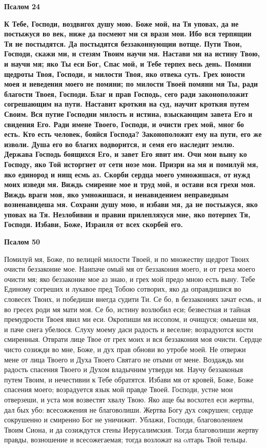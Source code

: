 \medskip
\bfseries Псалом 24\normalfont{}\nopagebreak

\bfseries \normalfont{}К Тебе, Господи, воздвигох душу мою. Боже мой, на Тя уповах, да не постыжуся во век, ниже да посмеют ми ся врази мои. Ибо вся терпящии Тя не постыдятся. Да постыдятся беззаконнующии вотще. Пути Твои, Господи, скажи ми, и стезям Твоим научи мя. Настави мя на истину Твою, и научи мя; яко Ты еси Бог, Спас мой, и Тебе терпех весь день. Помяни щедроты Твоя, Господи, и милости Твоя, яко отвека суть. Грех юности моея и неведения моего не помяни; по милости Твоей помяни мя Ты, ради благости Твоея, Господи. Благ и прав Господь, сего ради законоположит согрешающим на пути. Наставит кроткия на суд, научит кроткия путем Своим. Вся путие Господни милость и истина, взыскающим завета Его и свидения Его. Ради имене Твоего, Господи, и очисти грех мой, мног бо есть. Кто есть человек, бояйся Господа? Законоположит ему на пути, его же изволи. Душа его во благих водворится, и семя его наследит землю. Держава Господь боящихся Его, и завет Его явит им. Очи мои выну ко Господу, яко Той исторгнет от сети нозе мои. Призри на мя и помилуй мя, яко единород и нищ есмь аз. Скорби сердца моего умножишася, от нужд моих изведи мя. Виждь смирение мое и труд мой, и остави вся грехи моя. Виждь враги моя, яко умножишася, и ненавидением неправедным возненавидеша мя. Сохрани душу мою, и избави мя, да не постыжуся, яко уповах на Тя. Незлобивии и правии прилепляхуся мне, яко потерпех Тя, Господи. Избави, Боже, Израиля от всех скорбей его.


\medskip
\bfseries Псалом 50\normalfont{}\nopagebreak

Помилуй мя, Боже, по велицей милости Твоей, и по множеству щедрот Твоих очисти беззаконие мое. Наипаче омый мя от беззакония моего, и от греха моего очисти мя; яко беззаконие мое аз знаю, и грех мой предо мною есть выну. Тебе Единому согреших и лукавое пред Тобою сотворих, яко да оправдишися во словесех Твоих, и победиши внегда судити Ти. Се бо, в беззакониях зачат есмь, и во гресех роди мя мати моя. Се бо, истину возлюбил еси; безвестная и тайная премудрости Твоея явил ми еси. Окропиши мя иссопом, и очищуся; омыеши мя, и паче снега убелюся. Слуху моему даси радость и веселие; возрадуются кости смиренныя. Отврати лице Твое от грех моих и вся беззакония моя очисти. Сердце чисто созижди во мне, Боже, и дух прав обнови во утробе моей. Не отвержи мене от лица Твоего и Духа Твоего Святаго не отыми от мене. Воздаждь ми радость спасения Твоего и Духом владычним утверди мя. Научу беззаконыя путем Твоим, и нечестивии к Тебе обратятся. Избави мя от кровей, Боже, Боже спасения моего; возрадуется язык мой правде Твоей. Господи, устне мои отверзеши, и уста моя возвестят хвалу Твою. Яко аще бы восхотел еси жертвы, дал бых убо: всесожжения не благоволиши. Жертва Богу дух сокрушен; сердце сокрушенно и смиренно Бог не уничижит. Ублажи, Господи, благоволением Твоим Сиона, и да созиждутся стены Иерусалимския. Тогда благоволиши жертву правды, возношение и всесожегаемая; тогда возложат на oлтарь Твой тельцы.





